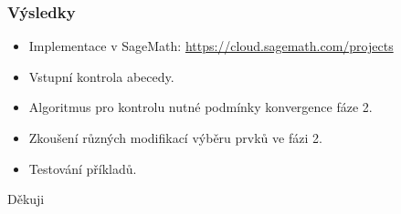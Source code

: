 \documentclass[11pt]{beamer}
\begin{document}
\begin{frame}
    \frametitle{Výsledky}    
    \begin{itemize}
        \item Implementace v SageMath: \url{https://cloud.sagemath.com/projects}
        \item Vstupní kontrola abecedy.
        \item Algoritmus pro kontrolu nutné podmínky konvergence fáze 2.
        \item Zkoušení různých modifikací výběru prvků ve fázi 2.
        \item Testování příkladů.
    \end{itemize}
\end{frame}


\begin{frame}
\fontsize{14pt}{10}\selectfont
\begin{center}
Děkuji

\end{center}    

\end{frame}
\end{document}
